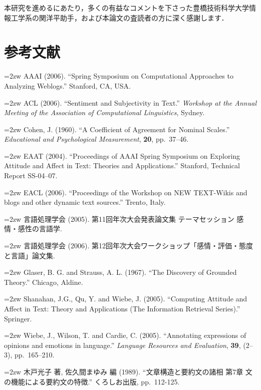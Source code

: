 \documentclass[japanese]{jnlp_1.3a}
\begin{document}
\acknowledgment

本研究を進めるにあたり，多くの有益なコメントを下さった豊橋技術科学大学情報工学系の関洋平助手，および本論文の査読者の方に深く感謝します．

\section*{参考文献}

\noindent{}\hangindent=2zw
AAAI (2006). ``Spring Symposium on Computational Approaches to Analyzing 
Weblogs.'' Stanford, CA, USA.

\noindent{}\hangindent=2zw
ACL (2006). ``Sentiment and Subjectivity in Text.'' \textit{Workshop at the Annual Meeting of the Association of Computational Linguistics}, Sydney.

\noindent{}\hangindent=2zw
Cohen, J. (1960). ``A Coefficient of Agreement for Nominal Scales.'' 
\textit{Educational and Psychological Measurement}, \textbf{20}, pp.~37--46.

\noindent{}\hangindent=2zw
EAAT (2004). ``Proceedings of AAAI Spring Symposium on Exploring Attitude 
and Affect in Text: Theories and Applications.'' Stanford, Technical Report 
SS-04--07.

\noindent{}\hangindent=2zw
EACL (2006). ``Proceedings of the Workshop on NEW TEXT-Wikis and blogs and 
other dynamic text sources.'' Trento, Italy.

\noindent{}\hangindent=2zw
言語処理学会 (2005). 第11回年次大会発表論文集 テーマセッション 
感情・感性の言語学.

\noindent{}\hangindent=2zw
言語処理学会 (2006). 
第12回年次大会ワークショップ「感情・評価・態度と言語」論文集.

\noindent{}\hangindent=2zw
Glaser, B. G. and Strauss, A. L. (1967). ``The Discovery of Grounded 
Theory.'' Chicago, Aldine.

\noindent{}\hangindent=2zw
Shanahan, J.G., Qu, Y. and Wiebe, J. (2005). ``Computing Attitude and Affect 
in Text: Theory and Applications (The Information Retrieval Series).'' 
Springer.

\noindent{}\hangindent=2zw
Wiebe, J., Wilson, T. and Cardie, C. (2005). ``Annotating expressions of 
opinions and emotions in language.'' \textit{Language Resources and Evaluation}, \textbf{39}, (2--3), pp.~165--210.

\noindent{}\hangindent=2zw
木戸光子 著, 佐久間まゆみ 編 (1989). ``文章構造と要約文の諸相 第7章 
文の機能による要約文の特徴.'' くろしお出版, pp.~112-125.
\end{document}
